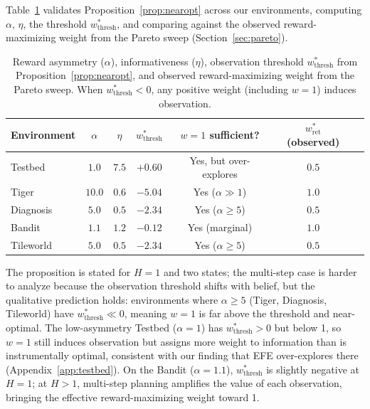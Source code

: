 \documentclass{article}
\begin{document}
Table~\ref{tab:alpha_eta} validates Proposition~\ref{prop:nearopt} across our environments, computing $\alpha$, $\eta$, the threshold $w^*_{\text{thresh}}$, and comparing against the observed reward-maximizing weight from the Pareto sweep (Section~\ref{sec:pareto}).

\begin{table}[ht]
\centering
\caption{Reward asymmetry ($\alpha$), informativeness ($\eta$), observation threshold $w^*_{\text{thresh}}$ from Proposition~\ref{prop:nearopt}, and observed reward-maximizing weight from the Pareto sweep. When $w^*_{\text{thresh}} < 0$, any positive weight (including $w{=}1$) induces observation.}
\label{tab:alpha_eta}
\begin{small}
\begin{tabular}{lcccccc}
\toprule
Environment & $\alpha$ & $\eta$ & $w^*_{\text{thresh}}$ & $w{=}1$ sufficient? & $w^*_{\text{ret}}$ (observed) \\
\midrule
Testbed & $1.0$ & $7.5$ & $+0.60$ & Yes, but over-explores & $0.5$ \\
Tiger & $10.0$ & $0.6$ & $-5.04$ & Yes ($\alpha \gg 1$) & $1.0$ \\
Diagnosis & $5.0$ & $0.5$ & $-2.34$ & Yes ($\alpha \geq 5$) & $0.5$ \\
Bandit & $1.1$ & $1.2$ & $-0.12$ & Yes (marginal) & $1.0$ \\
Tileworld & $5.0$ & $0.5$ & $-2.34$ & Yes ($\alpha \geq 5$) & $0.5$ \\
\bottomrule
\end{tabular}
\end{small}
\end{table}

The proposition is stated for $H{=}1$ and two states; the multi-step case is harder to analyze because the observation threshold shifts with belief, but the qualitative prediction holds: environments where $\alpha \geq 5$ (Tiger, Diagnosis, Tileworld) have $w^*_{\text{thresh}} \ll 0$, meaning $w{=}1$ is far above the threshold and near-optimal. The low-asymmetry Testbed ($\alpha{=}1$) has $w^*_{\text{thresh}} > 0$ but below 1, so $w{=}1$ still induces observation but assigns more weight to information than is instrumentally optimal, consistent with our finding that EFE over-explores there (Appendix~\ref{app:testbed}). On the Bandit ($\alpha{=}1.1$), $w^*_{\text{thresh}}$ is slightly negative at $H{=}1$; at $H{>}1$, multi-step planning amplifies the value of each observation, bringing the effective reward-maximizing weight toward 1.
\end{document}
